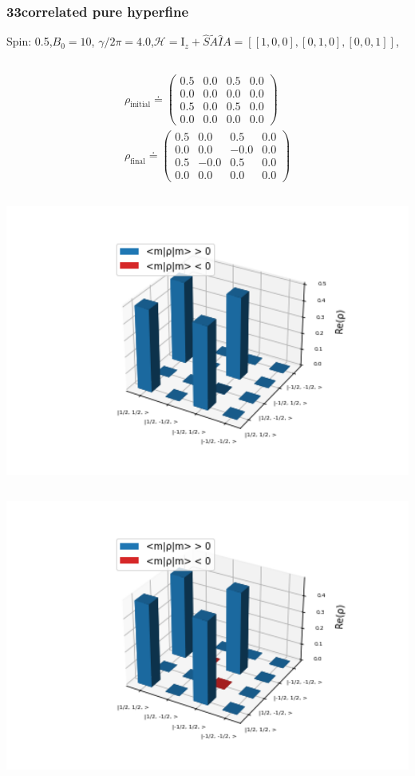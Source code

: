 \documentclass[10pt]{beamer}
\begin{document}
\begin{frame}
\frametitle{33correlated pure hyperfine}
Spin: 0.5,$B_0= 10$, $\gamma/2\pi = 4.0$,$\mathcal{H}=\text{I}_{z}+ \hat{S}\tilde{A}\hat{I}$$A=[[1, 0, 0], [0, 1, 0], [0, 0, 1]]$,
\begin{columns}[T]
\begin{column}{.5\textwidth}
\begin{align*}
\rho_{\text{initial}}\doteq
\begin{pmatrix}
0.5 & 0.0 & 0.5 & 0.0 \\
0.0 & 0.0 & 0.0 & 0.0 \\
0.5 & 0.0 & 0.5 & 0.0 \\
0.0 & 0.0 & 0.0 & 0.0
\end{pmatrix}
\\
\rho_{\text{final}}\doteq
\begin{pmatrix}
0.5 & 0.0 & 0.5 & 0.0 \\
0.0 & 0.0 & -0.0 & 0.0 \\
0.5 & -0.0 & 0.5 & 0.0 \\
0.0 & 0.0 & 0.0 & 0.0
\end{pmatrix}
\end{align*}
\begin{column}{.5\textwidth}
\includegraphics[width=1.5\textwidth]{./spin1-2/33correlated_pure_hyperfine/InitialRealPartDensityMatrix.png}
\end{column}
\begin{column}{.5\textwidth}
\includegraphics[width=1.5\textwidth]{./spin1-2/33correlated_pure_hyperfine/EvolvedRealPartDensityMatrix.png}

\end{column}
\end{column}
\end{columns}$$
\end{frame}
\end{document}
